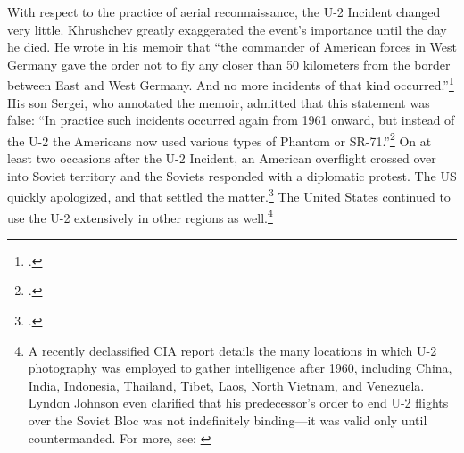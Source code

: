 \documentclass[12pt]{extarticle}
\begin{document}
With respect to the practice of aerial reconnaissance, the U-2 Incident changed very little. Khrushchev greatly exaggerated the event's importance until the day he died. He wrote in his memoir that \enquote{the commander of American forces in West Germany gave the order not to fly any closer than 50 kilometers from the border between East and West Germany. And no more incidents of that kind occurred.}\footcite[256]{khrushchev_memoirs_2007} His son Sergei, who annotated the memoir, admitted that this statement was false: \enquote{In practice such incidents occurred again from 1961 onward, but instead of the U-2 the Americans now used various types of Phantom or SR-71.}\footcite[258]{khrushchev_memoirs_2007} On at least two occasions after the U-2 Incident, an American overflight crossed over into Soviet territory and the Soviets responded with a diplomatic protest. The US quickly apologized, and that settled the matter.\footcite{orlov_u-2_2007} The United States continued to use the U-2 extensively in other regions as well.\footnote{A recently declassified CIA report details the many locations in which U-2 photography was employed to gather intelligence after 1960, including China, India, Indonesia, Thailand, Tibet, Laos, North Vietnam, and Venezuela. Lyndon Johnson even clarified that his predecessor's order to end U-2 flights over the Soviet Bloc was not indefinitely binding---it was valid only until countermanded. For more, see: \cite[195]{pedlow_central_1992}}



\end{document}
